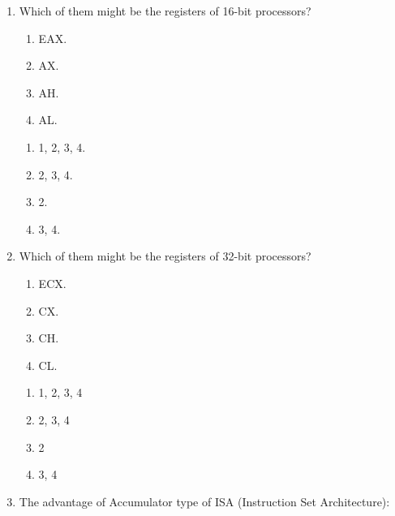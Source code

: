 \documentclass[paper=8.2in:11.6in]{scrartcl}
\begin{document}

\begin{enumerate}

\item Which of them might be the registers of 16-bit processors?

\begin{enumerate}[label=\arabic*.]

\item EAX.
\item AX.
\item AH.
\item AL.

\end{enumerate}

\begin{enumerate}[label=\alph*)]

\item 1, 2, 3, 4.
\item 2, 3, 4.
\item 2.
\item 3, 4.

\end{enumerate}

\item Which of them might be the registers of 32-bit processors?

\begin{enumerate}[label=\arabic*.]

\item ECX.
\item CX.
\item CH.
\item CL.

\end{enumerate}

\begin{enumerate}[label=\alph*)]

\item 1, 2, 3, 4
\item 2, 3, 4
\item 2
\item 3, 4

\end{enumerate}

\item The advantage of Accumulator type of ISA (Instruction Set Architecture):

\begin{enumerate}[label=\alph*)]


\end{enumerate}
\end{enumerate}
\end{document}
